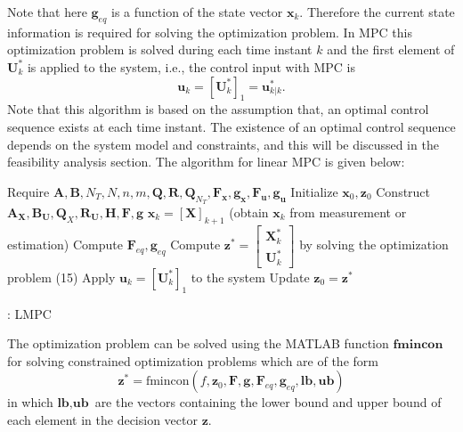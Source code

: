 \documentclass{article}
\begin{document}
Note that here $\textbf{g}_{eq}$ is a function of the state vector $\textbf{x}_{k}.$ Therefore the current state information is required for solving the optimization problem.  
In MPC this optimization problem is solved during each time instant $k$ and the first element of $\textbf{U}_{k}^{*}$ is applied to the system, i.e., the control input with MPC  is 
\begin{equation}
    \textbf{u}_{k}=[\textbf{U}_{k}^{*}]_{1}=\textbf{u}_{k|k}^{*}.
\end{equation}
Note that this algorithm is based on the assumption that, an optimal control sequence exists at each time instant. The existence of an optimal control sequence depends on the system model and constraints, and this will be discussed in the feasibility analysis section.
The algorithm for linear MPC is given below:
\begin{algorithm}[H]
 \small
	\begin{algorithmic}[1] 
	
	\STATE Require $\textbf{A},\textbf{B},N_{T},N,n,m,\textbf{Q},\textbf{R},\textbf{Q}_{N_T},\textbf{F}_{\textbf{x}},\textbf{g}_{\textbf{x}},\textbf{F}_{\textbf{u}},\textbf{g}_{\textbf{u}}$
		\STATE Initialize $\textbf{x}_{0},\textbf{z}_{0}$
		\STATE Construct $\textbf{A}_{\textbf{X}},\textbf{B}_{\textbf{U}},\textbf{Q}_{X},\textbf{R}_{\textbf{U}},\textbf{H},\textbf{F},\textbf{g}$
		\STATE $\textbf{x}_{k}=[\textbf{X}]_{k+1}$ (obtain $\textbf{x}_{k}$ from measurement or estimation)
		\STATE Compute $\textbf{F}_{eq},\textbf{g}_{eq}$
		\STATE  Compute $\textbf{z}^{*}=\left[\begin{matrix}\textbf{X}_{k}^{*}\\\textbf{U}_{k}^{*}\end{matrix}\right]$ by solving the optimization problem (15)
		\STATE Apply  $\textbf{u}_{k}=[\textbf{U}_{k}^{*}]_{1}$ to the system
		\STATE Update $\textbf{z}_{0}=\textbf{z}^{*}$
		\ENDFOR
	\end{algorithmic}
	\caption{: LMPC}
\end{algorithm}
The optimization problem can be solved using the MATLAB function $\textbf{fmincon}$ for solving  constrained optimization problems which are of the form
    \begin{equation}
        \textbf{z}^{*}=\mbox{fmincon}(f,\textbf{z}_{0},\textbf{F},\textbf{g},\textbf{F}_{eq},\textbf{g}_{eq},\textbf{lb},\textbf{ub})
    \end{equation}
    in which $\textbf{lb},\textbf{ub}$ are the vectors containing the lower bound and upper bound of each element in the decision vector $\textbf{z}.$
\end{document}
